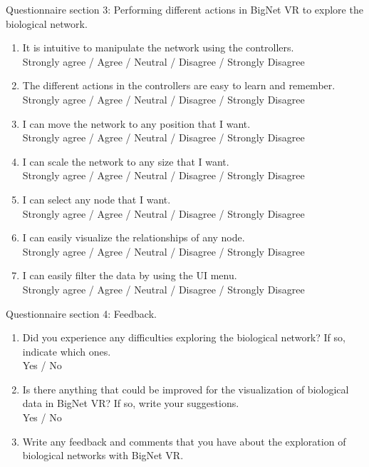 Questionnaire section 3: Performing different actions in BigNet VR to explore the biological network.
\begin{enumerate}
  \item It is intuitive to manipulate the network using the controllers.\\
  Strongly agree / Agree / Neutral / Disagree / Strongly Disagree

  \item The different actions in the controllers are easy to learn and remember.\\
  Strongly agree / Agree / Neutral / Disagree / Strongly Disagree

  \item I can move the network to any position that I want.\\
  Strongly agree / Agree / Neutral / Disagree / Strongly Disagree

  \item I can scale the network to any size that I want.\\
  Strongly agree / Agree / Neutral / Disagree / Strongly Disagree

  \item I can select any node that I want.\\
  Strongly agree / Agree / Neutral / Disagree / Strongly Disagree

  \item I can easily visualize the relationships of any node.\\
  Strongly agree / Agree / Neutral / Disagree / Strongly Disagree

  \item I can easily filter the data by using the UI menu.\\
  Strongly agree / Agree / Neutral / Disagree / Strongly Disagree\\
\end{enumerate}

Questionnaire section 4: Feedback.
\begin{enumerate}
  \item Did you experience any difficulties exploring the biological network? If so, indicate which ones.\\
  Yes / No

  \item Is there anything that could be improved for the visualization of biological data in BigNet VR? If so, write your suggestions.\\
  Yes / No

  \item Write any feedback and comments that you have about the exploration of biological networks with BigNet VR.
\end{enumerate}
